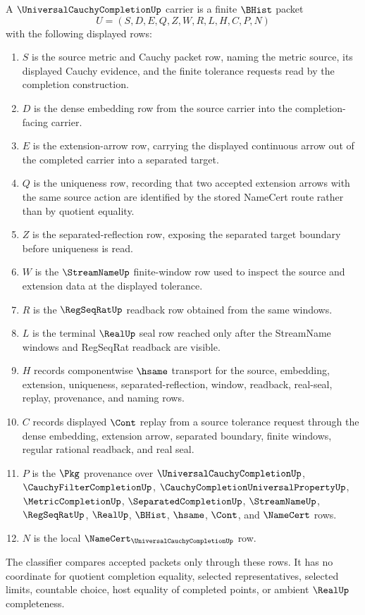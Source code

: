 \begin{definition}
\label{def:universal-cauchy-completion-carrier}
A $\UniversalCauchyCompletionUp$ carrier is a finite $\BHist$ packet
$$
U=(S,D,E,Q,Z,W,R,L,H,C,P,N)
$$
with the following displayed rows:
\begin{enumerate}
\item $S$ is the source metric and Cauchy packet row, naming the metric source, its displayed Cauchy evidence, and the finite tolerance requests read by the completion construction.
\item $D$ is the dense embedding row from the source carrier into the completion-facing carrier.
\item $E$ is the extension-arrow row, carrying the displayed continuous arrow out of the completed carrier into a separated target.
\item $Q$ is the uniqueness row, recording that two accepted extension arrows with the same source action are identified by the stored NameCert route rather than by quotient equality.
\item $Z$ is the separated-reflection row, exposing the separated target boundary before uniqueness is read.
\item $W$ is the $\StreamNameUp$ finite-window row used to inspect the source and extension data at the displayed tolerance.
\item $R$ is the $\RegSeqRatUp$ readback row obtained from the same windows.
\item $L$ is the terminal $\RealUp$ seal row reached only after the StreamName windows and RegSeqRat readback are visible.
\item $H$ records componentwise $\hsame$ transport for the source, embedding, extension, uniqueness, separated-reflection, window, readback, real-seal, replay, provenance, and naming rows.
\item $C$ records displayed $\Cont$ replay from a source tolerance request through the dense embedding, extension arrow, separated boundary, finite windows, regular rational readback, and real seal.
\item $P$ is the $\Pkg$ provenance over $\UniversalCauchyCompletionUp$, $\CauchyFilterCompletionUp$, $\CauchyCompletionUniversalPropertyUp$, $\MetricCompletionUp$, $\SeparatedCompletionUp$, $\StreamNameUp$, $\RegSeqRatUp$, $\RealUp$, $\BHist$, $\hsame$, $\Cont$, and $\NameCert$ rows.
\item $N$ is the local $\NameCert_{\UniversalCauchyCompletionUp}$ row.
\end{enumerate}
The classifier compares accepted packets only through these rows. It has no coordinate for quotient completion equality, selected representatives, selected limits, countable choice, host equality of completed points, or ambient $\RealUp$ completeness.
\end{definition}

